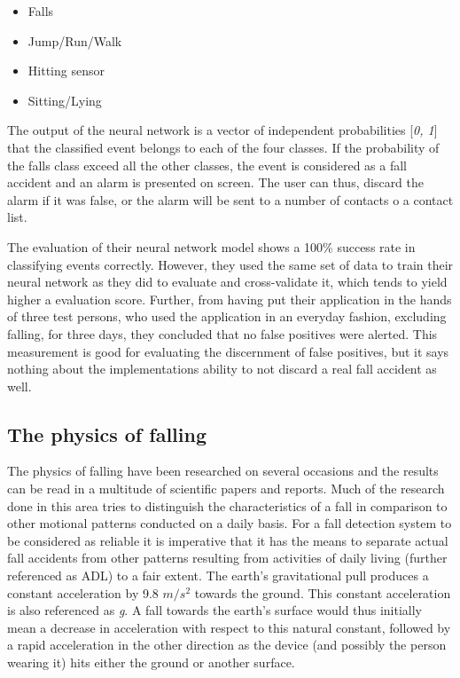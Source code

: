 \documentclass[12pt, a4paper, onecolumn]{article}
\begin{document}
	\begin{itemize}
		\item Falls
		\item Jump/Run/Walk
		\item Hitting sensor
		\item Sitting/Lying
	\end{itemize}

	The output of the neural network is a vector of independent probabilities [\textit{0, 1}] that the classified event belongs to each of the four classes. If the probability of the falls class exceed all the other classes, the event is considered as a fall accident and an alarm is presented on screen. The user can thus, discard the alarm if it was false, or the alarm will be sent to a number of contacts o a contact list. 

	The evaluation of their neural network model shows a 100\% success rate in classifying events correctly. However, they used the same set of data to train their neural network as they did to evaluate and cross-validate it, which tends to yield higher a evaluation score. Further, from having put their application in the hands of three test persons, who used the application in an everyday fashion, excluding falling, for three days, they concluded that no false positives were alerted. This measurement is good for evaluating the discernment of false positives, but it says nothing about the implementations ability to not discard a real fall accident as well. 
	
	\subsection{The physics of falling}
	The physics of falling have been researched on several occasions and the results can be read in a multitude of scientific papers and reports. Much of the research done in this area tries to distinguish the characteristics of a fall in comparison to other motional patterns conducted on a daily basis. For a fall detection system to be considered as reliable it is imperative that it has the means to separate actual fall accidents from other patterns resulting from activities of daily living (further referenced as ADL) to a fair extent. The earth's gravitational pull produces a constant acceleration by 9.8 $m/s^{2}$ towards the ground. This constant acceleration is also referenced as \textit{g}. A fall towards the earth's surface would thus initially mean a decrease in acceleration with respect to this natural constant, followed by a rapid acceleration in the other direction as the device (and possibly the person wearing it) hits either the ground or another surface.
	
\end{document}
